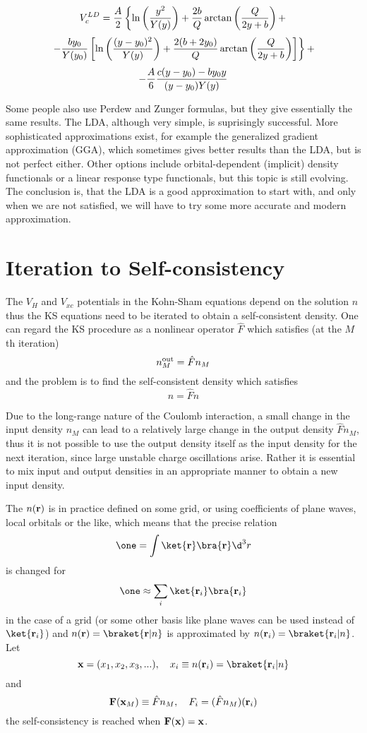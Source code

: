 $$V_c^{LD}={A\over2}\left\{
\ln\left(y^2\over Y(y)\right)+{2b\over Q}\arctan\left(Q\over 2y+b\right)+
\right.
$$
$$\left.
-{by_0\over Y(y_0)}\left[\ln\left((y-y_0)^2\over Y(y)\right)
+{2(b+2y_0)\over Q}\arctan\left(Q\over 2y+b\right)
\right] \right\}+$$
$$
-{A\over6}{c(y-y_0)-by_0y\over (y-y_0)Y(y)}
$$

Some people also use Perdew and Zunger formulas, but they give essentially the
same results.
The LDA, although very simple, is suprisingly successful. More sophisticated
approximations exist, for example the generalized gradient approximation (GGA),
which sometimes gives better results than the LDA, but is not perfect either.
Other options include orbital-dependent (implicit) density functionals or a
linear response type functionals, but this topic is still evolving. The
conclusion is, that the LDA is a good approximation to start with, and only
when we are not satisfied, we will have to try some more accurate and modern
approximation.

\section{Iteration to Self-consistency}

The $V_H$ and $V_{xc}$ potentials in the Kohn-Sham equations  depend
on the solution $n$ thus the KS equations need to be iterated to obtain a 
self-consistent density. One can regard the KS procedure as a nonlinear operator
$\hat F$ which satisfies (at the $M$th iteration)
$$n_M^{\rm out}=\hat F n_M $$
and the problem is to find the self-consistent density which satisfies
$$n=\hat F n $$

Due to the long-range nature of the Coulomb interaction, a small change in the
input density $n_M$ can lead to a relatively large change in the output density
$\hat F n_M$, thus it is not possible to use the output density itself as the
input density for the next iteration, since large unstable charge oscillations
arise.  Rather it is essential to mix input and output densities in an
appropriate manner to obtain a new input density. 

\def\F{{\bf F}}
\def\R{{\bf R}}
\def\J{{\bf J}}
\def\x{{\bf x}}
\def\y{{\bf y}}
The $n(\bf r)$ is in practice defined on some grid, or using
coefficients of plane waves, local orbitals or the like, which means that the
precise relation
$$\one=\int \ket{\bf r}\bra{\bf r}\d^3 r$$ is 
changed for
$$\one\approx\sum_i \ket{{\bf r}_i}\bra{{\bf r}_i}$$ 
in the case of a grid (or some other basis like plane waves can be used instead
of $\ket{{\bf r}_i}$) and $n({\bf r})=\braket{{\bf r}|n}$ is approximated by
$n({\bf r}_i)=\braket{{\bf r}_i|n}$. 
Let 
$$\x=(x_1,x_2,x_3,...),\quad x_i\equiv n({\bf r}_i)=\braket{{\bf r}_i|n}$$
and
$$\F(\x_M)\equiv \hat F n_M, \quad F_i= (\hat F n_M)({\bf r}_i)$$
the self-consistency is reached when $\F(\x)=\x$.

